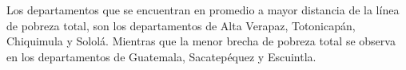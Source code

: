 Los departamentos que se encuentran en promedio a mayor distancia de la línea de pobreza total, son los departamentos de Alta Verapaz, Totonicapán, Chiquimula y Sololá. Mientras que la menor brecha de pobreza total se observa en los departamentos de Guatemala, Sacatepéquez y Escuintla. 
